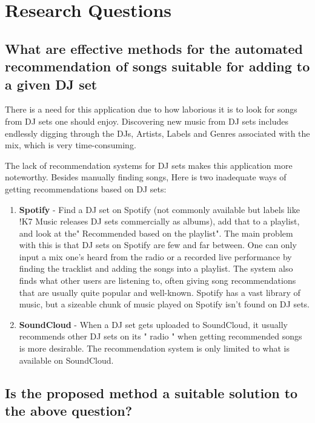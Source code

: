 \documentclass[11pt,titlepage,oneside]{book}
\begin{document}
	
\section{Research Questions}
	\subsection{What are effective methods for the automated recommendation of songs suitable for adding to a given DJ set}
	
	There is a need for this application due to how laborious it is to look for songs from DJ sets one  should enjoy. Discovering new music from DJ sets includes endlessly digging through the DJs, Artists, Labels and Genres associated with the mix, which is very time-consuming. 
	
	\begin{flushleft}
		The lack of recommendation systems for DJ sets makes this application more noteworthy. Besides manually finding songs, Here is two inadequate ways of getting recommendations based on DJ sets:
	\end{flushleft}
	
	\begin{enumerate}
		
		\item \textbf{Spotify }- Find a DJ set on Spotify (not commonly available but labels like !K7 Music releases DJ sets commercially as albums), add that to a playlist, and look at the" Recommended based on the playlist". The main problem with this is that DJ sets on Spotify are few and far between. One can only input a mix one's heard from the radio or a recorded live performance by finding the tracklist and adding the songs into a playlist. The system also finds what other users are listening to, often giving song recommendations that are usually quite popular and well-known. Spotify has a vast library of music, but a sizeable chunk of music played on Spotify isn't found on DJ sets. 
		
		\item \textbf{SoundCloud }- When a DJ set gets uploaded to SoundCloud, it usually recommends other DJ sets on its " radio " when getting recommended songs is more desirable. The recommendation system is only limited to what is available on SoundCloud.
	\end{enumerate}

	\subsection{Is the proposed method a suitable solution to the above question?}
	
\end{document}

